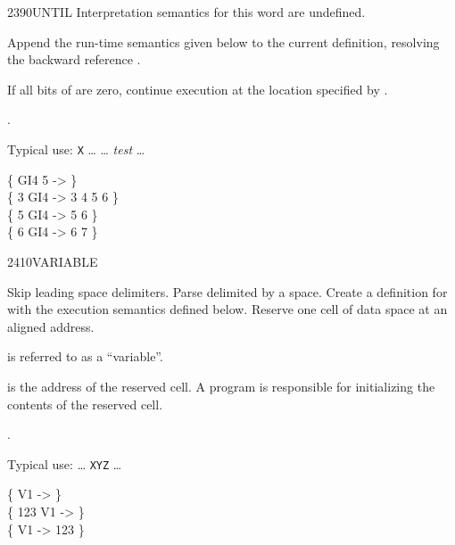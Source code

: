 \begin{worddef}{2390}{UNTIL}
\interpret
	Interpretation semantics for this word are undefined.

\compile

	Append the run-time semantics given below to the current
	definition, resolving the backward reference .

\runtime

	If all bits of  are zero, continue execution at the
	location specified by .

\see {}.

	\begin{defer}
	\rationale %
		Typical use:
			\word{:} \texttt{X} {\ldots}
				 {\ldots} \emph{test} 
				{\ldots} \word{;}

	\testing
		\{ \word{:} GI4     5   \word{;} -> \} \\
		\{ 3 GI4 -> 3 4 5 6 \} \\
		\{ 5 GI4 -> 5 6 \} \\
		\{ 6 GI4 -> 6 7 \}
	\end{defer}
\end{worddef}


\begin{worddef}{2410}{VARIABLE}
\item {}

	Skip leading space delimiters. Parse  delimited by
	a space. Create a definition for  with the execution
	semantics defined below. Reserve one cell of data space at an
	aligned address.

	 is referred to as a ``variable''.

\execute[name]
	\stack{}{a-addr}

	 is the address of the reserved cell. A program
	is responsible for initializing the contents of the reserved
	cell.

\see {}.

	\begin{defer}
	\rationale %
		Typical use:
			{\ldots}  \texttt{XYZ} {\ldots}

	\testing
		\{  V1 ->     \} \\
		\{    123 V1 \word{!} ->     \} \\
		\{        V1  -> 123 \}
	\end{defer}
\end{worddef}


